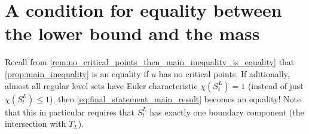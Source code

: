 \documentclass[titlepage,numbers=noenddot,oneside,%
cleardoublepage=empty,paper=a4,fontsize=11pt,%
english,%
]{scrartcl}
\begin{document}
\section{A condition for equality between the lower bound and the mass}\label{sec:condition_for_mass_equality}
\begin{remark}\label{rem:condition_for_mass_equality}
    Recall from \cref{rem:no_critical_points_then_main_inequality_is_equality} that \cref{prop:main_inequality} is an equality if \( u \) has no critical points. If aditionally, almost all regular level sets have Euler characteristic \( \chi(S_t^L)=1 \) (instead of just \( \chi(S_t^L)\leq 1 \)), then \cref{eq:final_statement_main_result} becomes an equality! Note that this in particular requires that \( S_t^L \) has exactly one boundary component (the intersection with \( T_L \)). 
\end{remark}
\end{document}
